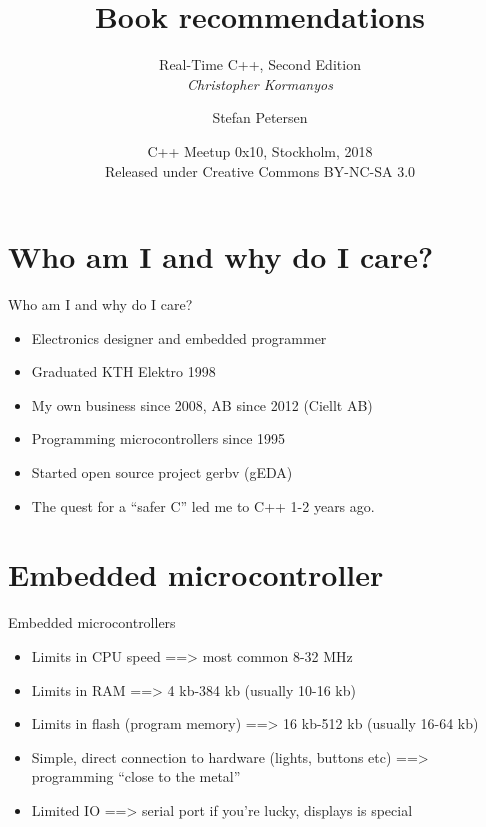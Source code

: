 \documentclass{beamer}
\title{Book recommendations }
\subtitle{Real-Time C++, Second Edition \\ \emph{Christopher Kormanyos}}
\author{Stefan Petersen}
\date[2018-10-25]{C++ Meetup 0x10, Stockholm, 2018 \\
  Released under Creative Commons BY-NC-SA 3.0 \\
  \cc \byncsa}
\begin{document}
\begin{frame}
  \titlepage
\end{frame}
\section{Who am I and why do I care?}
\begin{frame}{Who am I and why do I care?}
  \begin{itemize}
  \item Electronics designer and embedded programmer
  \item Graduated KTH Elektro 1998
  \item My own business since 2008, AB since 2012 (Ciellt AB)
  \item Programming microcontrollers since 1995
  \item Started open source project gerbv (gEDA)
  \item The quest for a ``safer C'' led me to C++ 1-2 years ago.
  \end{itemize}
\end{frame}

\section{Embedded microcontroller}

\begin{frame}{Embedded microcontrollers}
  \begin{itemize}
  \item  Limits in CPU speed
    \pause ==> most common 8-32 MHz
    \pause \item Limits in RAM
    \pause ==> 4 kb-384 kb (usually 10-16 kb)
    \pause \item Limits in flash (program memory)
    \pause ==> 16 kb-512 kb (usually 16-64 kb)
    \pause \item Simple, direct connection to hardware (lights, buttons etc)
    \pause ==> programming ``close to the metal''
    \pause \item Limited IO
    \pause ==> serial port if you're lucky, displays is special
  \end{itemize}
\end{frame}
\end{document}
